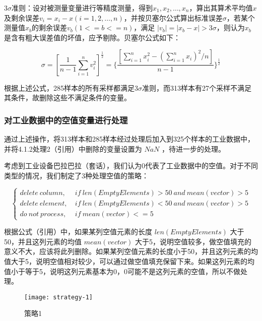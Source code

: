 \documentclass[bwprint]{gmcmthesis}
\begin{document}
3$\sigma$准则：设对被测量变量进行等精度测量，得到$x_1, x_2, \ldots, x_n$，算出其算术平均值$x$及剩余误差$v_i=x_i-x (i=1, 2, \ldots , n)$，并按贝塞尔公式算出标准误差$\sigma$，若某个测量值$x_b$的剩余误差$v_b ( 1 <= b <= n )$，满足 $|v_b| = | x_b - x | > 3\sigma$，则认为$x_b$是含有粗大误差值的坏值，应予剔除。贝塞尔公式如下：

\begin{equation}\label{eq:3sigma}
	\sigma = [\frac{1}{n-1}\sum_{i=1}^{n}v_i^2]^{\frac{1}{2}} = \{\frac{[\sum^n_{i=1}x_i^2 - (\sum^n_{i=1}x_i)^2/n]}{n-1}\}^{\frac{1}{2}}
\end{equation}

根据上述公式，285样本的所有采样都满足3$\sigma$准则，而313样本有27个采样不满足其条件，故删除这些不满足条件的变量。



\subsubsection{对工业数据中的空值变量进行处理}

通过上述操作，将313样本和285样本经过处理后加入到325个样本的工业数据中，并将4.1.2处理2（引用）中删除的变量设置为 $NaN$ ，待进一步的处理。

考虑到工业设备巴拉巴拉（套话），我们认为0代表了工业数据中的空值。对于不同类型的情况，我们制定了3种处理空值的策略：

\begin{equation}\label{eq:empty-strategies}
\left\{
\begin{aligned}
delete \ column, \ & if \ len(EmptyElements)>50 \ and \ mean(vector)>5 \\  
delete \ element, \ & if \ len(EmptyElements)<50 \ and \ mean(vector)>5\\  
do \ not \ process, \ & if \ mean(vector)<=5
\end{aligned}
\right.
\end{equation}

根据公式（引用）中，如果某列空值元素的长度 $len(EmptyElements)$ 大于50，并且这列元素的均值 $ mean(vector)$ 大于5，说明空值较多，做空值填充的意义不大，应该将此列删除。如果某列空值元素的长度小于50，并且这列元素的均值大于5，说明空值相对较少，可以通过做空值填充保留下来。如果这列元素的均值小于等于5，说明这列元素基本为0，0可能不是这列元素的空值，所以不做处理。

\begin{figure}[htbp]
	\centering
	\texttt{[image: strategy-1]}
	\caption{策略1}
\end{figure}
\end{document}
